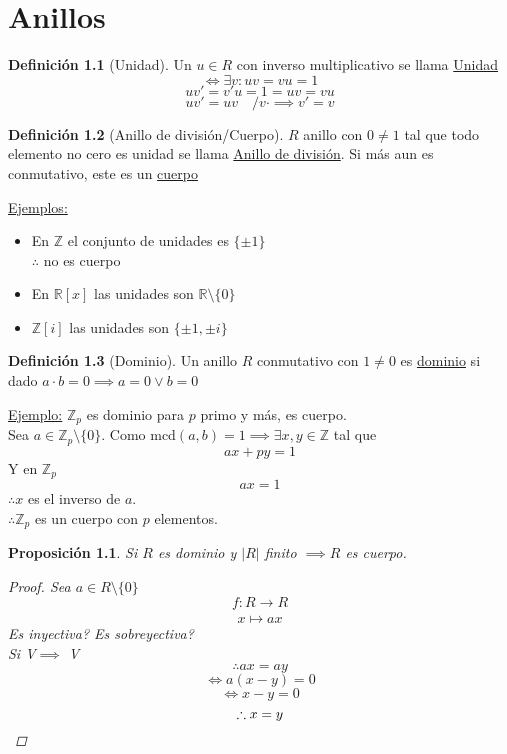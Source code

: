 \documentclass[11pt]{book}
\newcommand{\set}[1]{\mathbb{#1}}
\newcommand{\func}[5]{#1:#2\xrightarrow[#5]{#4}#3}
\newtheorem{prop}[thm]{Proposición}
\theoremstyle{definition}
\newtheorem{defn}{Definición}[section]
\begin{document}
\chapter{Anillos}
\begin{defn}[Unidad]
	Un $u\in R$ con inverso multiplicativo se llama \underline{Unidad}
	\[\iff \exists v:uv=vu=1\]
	\[uv'=v'u=1=uv=vu\]
	\[uv'=uv\quad /v\cdot\implies v'=v\]
\end{defn}
\begin{defn}[Anillo de división/Cuerpo]
	$R$ anillo con $0\neq 1$ tal que todo elemento no cero es unidad se llama \underline{Anillo de división}. Si más aun es conmutativo, este es un \underline{cuerpo}
\end{defn}
\underline{Ejemplos:}
\begin{itemize}
	\item En $\set{Z}$ el conjunto de unidades es $\{\pm 1\}$\\
	$\therefore$ no es cuerpo

	\item En $\set{R}[x]$ las unidades son $\set{R}\setminus\{0\}$

	\item $\set{Z}[i]$ las unidades son $\{\pm 1,\pm i\}$
\end{itemize}
\begin{defn}[Dominio]
	Un anillo $R$ conmutativo con $1\neq 0$ es \underline{dominio} si dado $a\cdot b=0\implies a=0\vee b=0$
\end{defn}
\underline{Ejemplo:}
$\set{Z}_p$ es dominio para $p$ primo y más, es cuerpo.\\
Sea $a\in\set{Z}_p\setminus\{0\}$. Como mcd$(a,b)=1\implies \exists x,y\in\set{Z}$ tal que
\[ax+py=1\]
Y en $\set{Z}_p$
\[ax=1\]
$\therefore x$ es el inverso de $a$.\\
$\therefore\set{Z}_p$ es un cuerpo con $p$ elementos.
\begin{prop}
	Si $R$ es dominio y $|R|$ finito $\implies R$ es cuerpo.
	\begin{proof}
		Sea $a\in R\setminus\{0\}$
		\[\func{f}{R}{R}{}{}\]
		\[x\mapsto ax\]
		Es inyectiva? Es sobreyectiva?\\
		Si V$\implies$ V
		\[\therefore ax=ay\]
		\[\iff a(x-y)=0\]
		\[\iff x-y=0\]
		\[\therefore x=y\qedhere\]
	\end{proof}
\end{prop}
\end{document}
